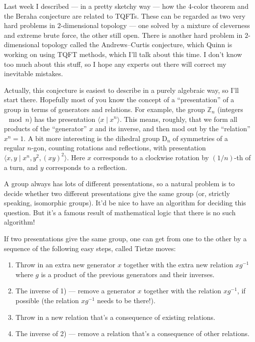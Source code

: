 \documentclass{article}
\def\tightlist{}
\begin{document}
Last week I described --- in a pretty sketchy way --- how the 4-color
theorem and the Beraha conjecture are related to TQFTs. These can be
regarded as two very hard problems in \(2\)-dimensional topology --- one
solved by a mixture of cleverness and extreme brute force, the other
still open. There is another hard problem in \(2\)-dimensional topology
called the Andrews--Curtis conjecture, which Quinn is working on using
TQFT methods, which I'll talk about this time. I don't know too much
about this stuff, so I hope any experts out there will correct my
inevitable mistakes.

Actually, this conjecture is easiest to describe in a purely algebraic
way, so I'll start there. Hopefully most of you know the concept of a
``presentation'' of a group in terms of generators and relations. For
example, the group \(\mathbb{Z}_n\) (integers \(\mod n\)) has the
presentation \(\langle x \mid x^n\rangle\). This means, roughly, that we
form all products of the ``generator'' \(x\) and its inverse, and then
mod out by the ``relation'' \(x^n = 1\). A bit more interesting is the
dihedral group \(\mathrm{D}_n\) of symmetries of a regular \(n\)-gon,
counting rotations and reflections, with presentation
\(\langle x,y \mid x^n, y^2, (xy)^2 \rangle\). Here \(x\) corresponds to
a clockwise rotation by \((1/n)\)-th of a turn, and \(y\) corresponds to
a reflection.

A group always has lots of different presentations, so a natural problem
is to decide whether two different presentations give the same group
(or, strictly speaking, isomorphic groups). It'd be nice to have an
algorithm for deciding this question. But it's a famous result of
mathematical logic that there is no such algorithm!

If two presentations give the same group, one can get from one to the
other by a sequence of the following easy steps, called Tietze moves:

\begin{enumerate}
\def\labelenumi{\arabic{enumi})}
\tightlist
\item
  Throw in an extra new generator \(x\) together with the extra new
  relation \(xg^{-1}\) where \(g\) is a product of the previous
  generators and their inverses.
\item
  The inverse of 1) --- remove a generator \(x\) together with the
  relation \(xg^{-1}\), if possible (the relation \(xg^{-1}\) needs to
  be there!).
\item
  Throw in a new relation that's a consequence of existing relations.
\item
  The inverse of 2) --- remove a relation that's a consequence of other
  relations.
\end{enumerate}
\end{document}
